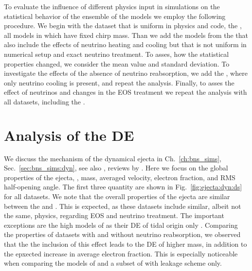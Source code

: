 To evaluate the influence of different physics input in simulations 
on the statistical behavior of the ensemble of the models we employ the following procedure.
%
We begin with the dataset that is uniform in physics and code, the \DSrefset{},
all models in which have fixed chirp mass.
Than we add the models from the \DSheatcool{} that also include the effects of neutrino 
heating and cooling but that is not uniform in numerical setup and exact neutrino treatment.
To asses, how the statistical properties changed, we consider the mean value and standard deviation.
To investigate the effects of the absence of neutrino reabsorption, we add the \DScool{},  
where only neutrino cooling is present, and repeat the analysis.
Finally, to asses the effect of neutrinos and changes in the \ac{EOS} treatment 
we repeat the analysis with all datasets, including the \DSnone{}.


\section{Analysis of the \ac{DE}}
\label{sec:res_stat_dynej}

We discuss the mechanism of the dynamical ejecta in Ch.~\ref{ch:bns_sims}, 
Sec.~\ref{sec:bns_sims:dyn}, see also \eg, reviews by 
\citet{Radice:2020ddv,Bernuzzi:2020tgt,Shibata:2019wef}. 
%
Here we focus on the global properties of the ejecta, \ie, mass, averaged velocity, 
electron fraction, and \ac{RMS} half-opening angle. The first three quantity are shown in 
Fig.~\ref{fig:ejecta:dyn:ds} for all datasets. We note that the overall properties of the 
ejecta are similar between the \DSrefset{} and \DSheatcool{}. This is expected, as these 
datasets include similar, albeit not the same, physics, regarding \ac{EOS} and neutrino treatment.
The important exceptions are the high \mr{} models of \DSrefset{} as their \ac{DE} of tidal 
origin only \citep{Bernuzzi:2020txg}.
Comparing the properties of datasets with and without neutrino reabsorption, we observed 
that the the inclusion of this effect leads to the \ac{DE} of higher mass, in addition to 
the epxected increase in average electron fraction. This is especially noticeable when 
comparing the models of \DSrefset{} and a subset of \citet{Radice:2018pdn} with leakage scheme only.

